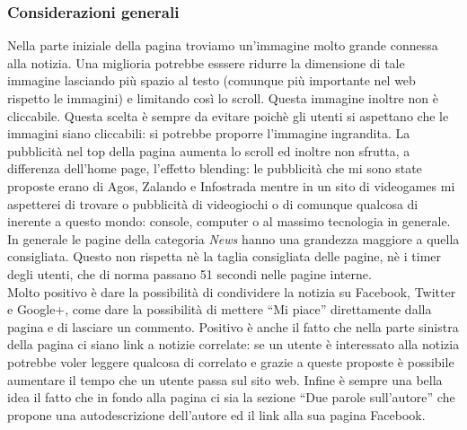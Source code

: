 \documentclass[../ProgettoTecWeb2.tex]{subfiles}
\begin{document}
		\subsubsection{Considerazioni generali}
		Nella parte iniziale della pagina troviamo un'immagine molto grande connessa alla notizia. Una miglioria potrebbe esssere ridurre la dimensione di tale immagine lasciando più spazio al testo (comunque più importante nel web rispetto le immagini) e limitando così lo scroll. Questa immagine inoltre non è cliccabile. Questa scelta è sempre da evitare poichè gli utenti si aspettano che le immagini siano cliccabili: si potrebbe proporre l'immagine ingrandita. La pubblicità nel top della pagina aumenta lo scroll ed inoltre non sfrutta, a differenza dell'home page, l'effetto blending: le pubblicità che mi sono state proposte erano di Agos, Zalando e Infostrada mentre in un sito di videogames mi aspetterei di trovare o pubblicità di videogiochi o di comunque qualcosa di inerente a questo mondo: console, computer o al massimo tecnologia in generale. \\

		In generale le pagine della categoria \textit{News} hanno una grandezza maggiore a quella consigliata. Questo non rispetta nè la taglia consigliata delle pagine, nè i timer degli utenti, che di norma passano 51 secondi nelle pagine interne. \\

		Molto positivo è dare la possibilità di condividere la notizia su Facebook, Twitter e Google+, come dare la possibilità di mettere ``Mi piace'' direttamente dalla pagina e di lasciare un commento. Positivo è anche il fatto che nella parte sinistra della pagina ci siano link a notizie correlate: se un utente è interessato alla notizia potrebbe voler leggere qualcosa di correlato e grazie a queste proposte è possibile aumentare il tempo che un utente passa sul sito web. Infine è sempre una bella idea il fatto che in fondo alla pagina ci sia la sezione ``Due parole sull'autore'' che propone una autodescrizione dell'autore ed il link alla sua pagina Facebook.

	\newpage
\end{document}
